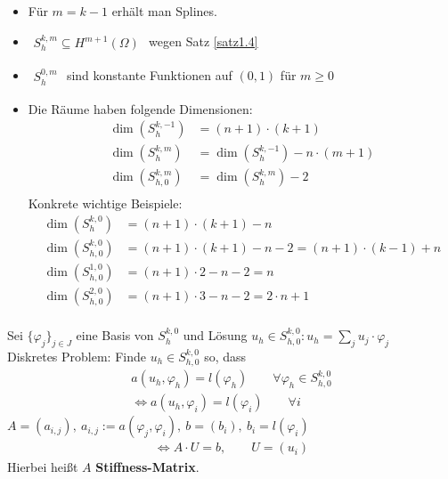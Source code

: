 \begin{bemerkung}\
\begin{itemize}
\item Für $m=k-1$ erhält man Splines.
\item $\begin{aligned}
S_h^{k,m}\subseteq H^{m+1}(\Omega)
\end{aligned}$ wegen Satz \ref{satz1.4}
\item $\begin{aligned}
S_h^{0,m}
\end{aligned}$ sind konstante Funktionen auf $(0,1)$ für $m\geq0$
\item Die Räume haben folgende Dimensionen:
\begin{align*}
\dim\left(S_h^{k,-1}\right)&=(n+1)\cdot(k+1)\\
\dim\left(S_h^{k,m}\right)&=\dim\left(S_h^{k,-1}\right)-n\cdot(m+1)\\
\dim\left(S_{h,0}^{k,m}\right)&=\dim\left(S_h^{k,m}\right)-2\\
\end{align*}
Konkrete wichtige Beispiele:
\begin{align*}
\dim\left(S_h^{k,0}\right)&=(n+1)\cdot(k+1)-n\\
\dim\left(S_{h,0}^{k,0}\right)&=(n+1)\cdot(k+1)-n-2=(n+1)\cdot(k-1)+n\\
\dim\left(S_{h,0}^{1,0}\right)&=(n+1)\cdot 2-n-2=n\\
\dim\left(S_{h,0}^{2,0}\right)&=(n+1)\cdot 3-n-2=2\cdot n+1\\
\end{align*}
\end{itemize}
\end{bemerkung}
Sei $\lbrace\varphi_j\rbrace_{j\in J}$ eine Basis von $S_h^{k,0}$
und Lösung $u_h\in S_{h,0}^{k,0}: u_h=\sum\limits_j u_j\cdot\varphi_j$\\
Diskretes Problem: Finde $u_h\in S_{h,0}^{k,0}$ so, dass 
\begin{align*}
a(u_h,\varphi_h)=l(\varphi_h)\qquad\forall \varphi_h\in S_{h,0}^{k,0}\\
\Longleftrightarrow a(u_h,\varphi_i)=l(\varphi_i)\qquad\forall i
\end{align*}
$A=(a_{i,j}),~a_{i,j}:=a(\varphi_j,\varphi_i),~b=(b_i),~b_i=l(\varphi_i)$
\begin{align*}
\Longleftrightarrow A\cdot U=b,\qquad U=(u_i)
\end{align*}
Hierbei heißt $A$ \textbf{Stiffness-Matrix}.

